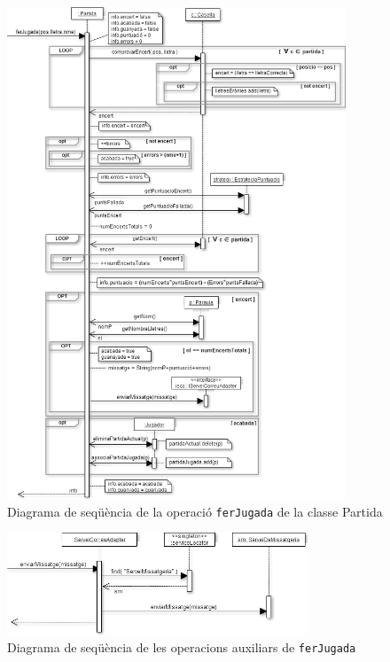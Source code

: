     \begin{figure}[h!]
    \centering
    \includegraphics[width=0.9\textwidth]{figures/ferJugadaBe2.png}
    \caption{Diagrama de seqüència de la operació \texttt{ferJugada} de la classe Partida}
    \end{figure}

    \begin{figure}[h!]
    \centering
    \includegraphics[width=0.8\textwidth]{figures/opsFerJugada.png}
    \caption{Diagrama de seqüència de les operacions auxiliars de \texttt{ferJugada}}
    \end{figure}
    
